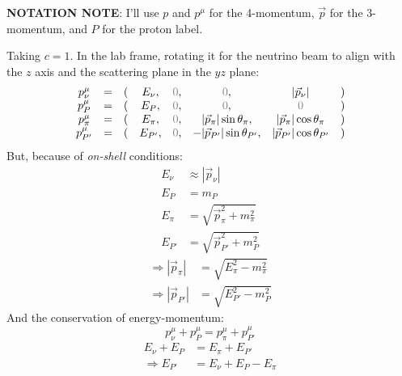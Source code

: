 \documentclass[]{article}
\numberwithin{equation}{section}
\newcommand{\0}{\textcolor{gray}{0}}
\begin{document}
\textbf{NOTATION NOTE}: I'll use \(p\) and \(p^\mu\) for the 4-momentum, \(\vec{p}\) for the 3-momentum, and \(P\) for the proton label.

Taking \(c=1\). In the lab frame, rotating it for the neutrino beam to align with the \(z\) axis and the scattering plane in the \(yz\) plane:
\begin{equation}
	\begin{matrix}
		p^\mu_\nu	&=&(&E_\nu,	&\0,&\0,								&|\vec{p}_\nu|				&)\\
		p^\mu_P 	&=&(&E_P,	&\0,&\0,								&\0							&)\\
		p^\mu_\pi 	&=&(&E_\pi,	&\0,&|\vec{p}_\pi|\sin\theta_{\pi},	&|\vec{p}_\pi|\cos\theta_{\pi}&)\\
		p^\mu_{P'}	&=&(&E_{P'},&\0,&-|\vec{p}_{P'}|\sin\theta_{P'},	&|\vec{p}_{P'}|\cos\theta_{P'}&)
	\end{matrix}
\end{equation}
But, because of \textit{on-shell} conditions:
\begin{align}
	E_\nu &\approx |\vec{p}_\nu|\label{Enu_equiv}\\
	E_P &= m_P\label{EP_equiv}\\
	E_\pi &= \sqrt{\vec{p}_\pi^2 + m_\pi^2}\label{Epi_equiv}\\
	E_{P'} &= \sqrt{\vec{p}_{P'}^2 + m_P^2}\label{EP'_equiv}
\end{align}
\begin{align}
	\Rightarrow |\vec{p}_\pi|  &= \sqrt{E_\pi^2  - m_\pi^2}\label{ppi_equiv}\\
	\Rightarrow |\vec{p}_{P'}| &= \sqrt{E_{P'}^2 - m_P^2}\label{pp'_equiv}
\end{align}
And the  conservation of energy-momentum:
\begin{equation}
	p^\mu_\nu + p^\mu_P = p^\mu_\pi + p^\mu_{P'}\label{cons_EM}
\end{equation}
\begin{align}
	E_\nu + E_P &= E_\pi + E_{P'}\nonumber\\
	\Rightarrow E_{P'} &= E_\nu + E_P - E_\pi\label{EP'_cons_E}
\end{align}
\end{document}
